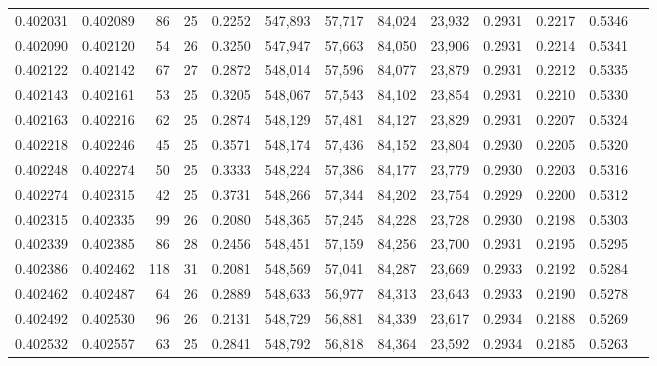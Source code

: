 \begin{tabular}{rrrrrrrrrrrrr}
0.402031 & 0.402089 &    86 &  25 &                                     0.2252 & 547,893 &  57,717 &  84,024 &  23,932 & 0.2931 & 0.2217 & 0.5346 \\
0.402090 & 0.402120 &    54 &  26 &                                     0.3250 & 547,947 &  57,663 &  84,050 &  23,906 & 0.2931 & 0.2214 & 0.5341 \\
0.402122 & 0.402142 &    67 &  27 &                                     0.2872 & 548,014 &  57,596 &  84,077 &  23,879 & 0.2931 & 0.2212 & 0.5335 \\
0.402143 & 0.402161 &    53 &  25 &                                     0.3205 & 548,067 &  57,543 &  84,102 &  23,854 & 0.2931 & 0.2210 & 0.5330 \\
0.402163 & 0.402216 &    62 &  25 &                                     0.2874 & 548,129 &  57,481 &  84,127 &  23,829 & 0.2931 & 0.2207 & 0.5324 \\
0.402218 & 0.402246 &    45 &  25 &                                     0.3571 & 548,174 &  57,436 &  84,152 &  23,804 & 0.2930 & 0.2205 & 0.5320 \\
0.402248 & 0.402274 &    50 &  25 &                                     0.3333 & 548,224 &  57,386 &  84,177 &  23,779 & 0.2930 & 0.2203 & 0.5316 \\
0.402274 & 0.402315 &    42 &  25 &                                     0.3731 & 548,266 &  57,344 &  84,202 &  23,754 & 0.2929 & 0.2200 & 0.5312 \\
0.402315 & 0.402335 &    99 &  26 &                                     0.2080 & 548,365 &  57,245 &  84,228 &  23,728 & 0.2930 & 0.2198 & 0.5303 \\
0.402339 & 0.402385 &    86 &  28 &                                     0.2456 & 548,451 &  57,159 &  84,256 &  23,700 & 0.2931 & 0.2195 & 0.5295 \\
0.402386 & 0.402462 &   118 &  31 &                                     0.2081 & 548,569 &  57,041 &  84,287 &  23,669 & 0.2933 & 0.2192 & 0.5284 \\
0.402462 & 0.402487 &    64 &  26 &                                     0.2889 & 548,633 &  56,977 &  84,313 &  23,643 & 0.2933 & 0.2190 & 0.5278 \\
0.402492 & 0.402530 &    96 &  26 &                                     0.2131 & 548,729 &  56,881 &  84,339 &  23,617 & 0.2934 & 0.2188 & 0.5269 \\
0.402532 & 0.402557 &    63 &  25 &                                     0.2841 & 548,792 &  56,818 &  84,364 &  23,592 & 0.2934 & 0.2185 & 0.5263 \\

\end{tabular}
